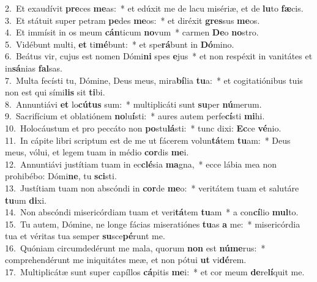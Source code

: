 {2.~}Et exaudívit \textbf{pre}ces \textbf{me}as:~* et edúxit me de lacu misériæ, et de \textbf{lu}to \textbf{fæ}cis.\\
{3.~}Et státuit super petram \textbf{pe}des \textbf{me}os:~* et diréxit \textbf{gres}sus \textbf{me}os.\\
{4.~}Et immísit in os meum \textbf{cán}ticum \textbf{no}vum~* carmen \textbf{De}o \textbf{no}stro.\\
{5.~}Vidébunt multi, \textbf{et} ti\textbf{mé}bunt:~* et spe\textbf{rá}bunt in \textbf{Dó}mino.\\
{6.~}Beátus vir, cujus est nomen Dómi\textbf{ni} spes \textbf{e}jus~* et non respéxit in vanitátes et in\textbf{sá}nias \textbf{fal}sas.\\
{7.~}Multa fecísti tu, Dómine, Deus meus, mira\textbf{bí}lia \textbf{tu}a:~* et cogitatiónibus tuis non est qui sími\textbf{lis} sit \textbf{ti}bi.\\
{8.~}Annuntiávi \textbf{et} lo\textbf{cú}\textbf{tus} sum:~* multiplicáti sunt \textbf{su}per \textbf{nú}merum.\\
{9.~}Sacrifícium et oblatiónem \textbf{no}lu\textbf{í}sti:~* aures autem perfe\textbf{cí}sti \textbf{mi}hi.\\
{10.~}Holocáustum et pro peccáto non \textbf{po}stu\textbf{lá}sti:~* tunc dixi: \textbf{Ec}ce \textbf{vé}nio.\\
{11.~}In cápite libri scriptum est de me ut fácerem volun\textbf{tá}tem \textbf{tu}am:~* Deus meus, vólui, et legem tuam in médio \textbf{cor}dis \textbf{me}i.\\
{12.~}Annuntiávi justítiam tuam in ec\textbf{clé}sia \textbf{ma}gna,~* ecce lábia mea non prohibébo: Dómi\textbf{ne}, tu \textbf{sci}sti.\\
{13.~}Justítiam tuam non abscóndi in \textbf{cor}de \textbf{me}o:~* veritátem tuam et salutáre \textbf{tu}um \textbf{di}xi.\\
{14.~}Non abscóndi misericórdiam tuam et veri\textbf{tá}tem \textbf{tu}am~* a con\textbf{cí}lio \textbf{mul}to.\\
{15.~}Tu autem, Dómine, ne longe fácias miseratiónes \textbf{tu}as \textbf{a} me:~* misericórdia tua et véritas tua semper \textbf{su}sce\textbf{pé}runt me.\\
{16.~}Quóniam circumdedérunt me mala, quorum \textbf{non} est \textbf{nú}\textbf{me}rus:~* comprehendérunt me iniquitátes meæ, et non pótui \textbf{ut} vi\textbf{dé}rem.\\
{17.~}Multiplicátæ sunt super capíllos \textbf{cá}pitis \textbf{me}i:~* et cor meum \textbf{de}re\textbf{lí}quit me.\\
